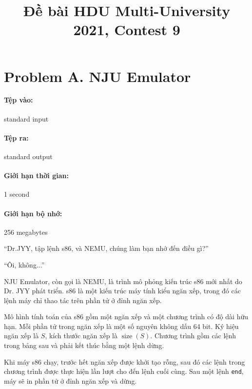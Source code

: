 \documentclass[11pt]{article}
\title{Đề bài HDU Multi-University 2021, Contest 9}
\author{}
\date{}
\begin{document}
\maketitle


\section{Problem A. NJU Emulator}

\paragraph{Tệp vào:} standard input
\paragraph{Tệp ra:} standard output
\paragraph{Giới hạn thời gian:} 1 second
\paragraph{Giới hạn bộ nhớ:} 256 megabytes

``Dr.JYY, tập lệnh s86, và NEMU, chúng làm bạn nhớ đến điều gì?''

``Ôi, không...''

NJU Emulator, còn gọi là NEMU, là trình mô phỏng kiến trúc s86 mới nhất do
Dr. JYY phát triển. s86 là một kiến trúc máy tính kiểu ngăn xếp, trong đó các
lệnh máy chỉ thao tác trên phần tử ở đỉnh ngăn xếp.

Mô hình tính toán của s86 gồm một ngăn xếp và một chương trình có độ dài hữu
hạn. Mỗi phần tử trong ngăn xếp là một số nguyên không dấu 64 bit. Ký hiệu
ngăn xếp là \(S\), kích thước ngăn xếp là \(\operatorname{size}(S)\). Chương
trình gồm các lệnh trong bảng sau và phải kết thúc bằng một lệnh dừng.

Khi máy s86 chạy, trước hết ngăn xếp được khởi tạo rỗng, sau đó các lệnh trong
chương trình được thực hiện lần lượt cho đến lệnh cuối cùng. Sau một lệnh
\texttt{end}, máy sẽ in phần tử ở đỉnh ngăn xếp và dừng.
\end{document}
